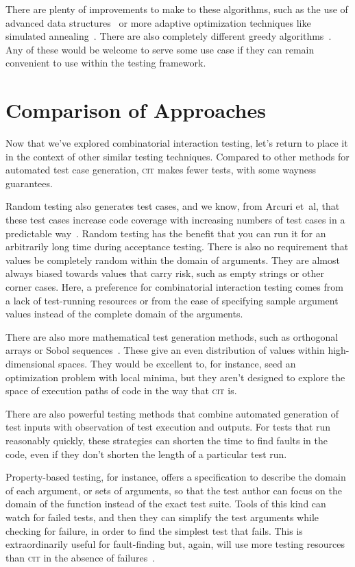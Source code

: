\documentclass{juliacon}
\newcommand{\cit}{\textsc{cit}\xspace}
\begin{document}
\vskip 6pt
There are plenty of improvements to make to these algorithms, such as the use of advanced data structures~\cite{Segall2011-jv} or more adaptive optimization techniques like simulated annealing~\cite{Petke2015-ex}. There are also completely different greedy algorithms~\cite{Calvagna2012-ic,Koc2018-vs}. Any of these would be welcome to serve some use case if they can remain convenient to use within the testing framework.


\section{Comparison of Approaches}\label{sec:comparison}

Now that we've explored combinatorial interaction testing, let's return to place it in the context of other similar testing techniques. Compared to other methods for automated test case generation, \cit makes fewer tests, with some wayness guarantees.

\vskip 6pt
Random testing also generates test cases, and we know, from Arcuri et~al, that these test cases increase code coverage with increasing numbers of test cases in a predictable way~\cite{Arcuri2012-az}. Random testing has the benefit that you can run it for an arbitrarily long time during acceptance testing. There is also no requirement that values be completely random within the domain of arguments. They are almost always biased towards values that carry risk, such as empty strings or other corner cases. Here, a preference for combinatorial interaction testing comes from a lack of test-running resources or from the ease of specifying sample argument values instead of the complete domain of the arguments.

\vskip 6pt
There are also more mathematical test generation methods, such as orthogonal arrays or Sobol sequences~\cite{He2013-th}. These give an even distribution of values within high-dimensional spaces. They would be excellent to, for instance, seed an optimization problem with local minima, but they aren't designed to explore the space of execution paths of code in the way that \cit is.

\vskip 6pt
There are also powerful testing methods that combine automated generation of test inputs with observation of test execution and outputs. For tests that run reasonably quickly, these strategies can shorten the time to find faults in the code, even if they don't shorten the length of a particular test run.

\vskip 6pt
Property-based testing, for instance, offers a specification to describe the domain of each argument, or sets of arguments, so that the test author can focus on the domain of the function instead of the exact test suite. Tools of this kind can watch for failed tests, and then they can simplify the test arguments while checking for failure, in order to find the simplest test that fails. This is extraordinarily useful for fault-finding but, again, will use more testing resources than \cit in the absence of failures~\cite{loscher2018automating}.
\end{document}
